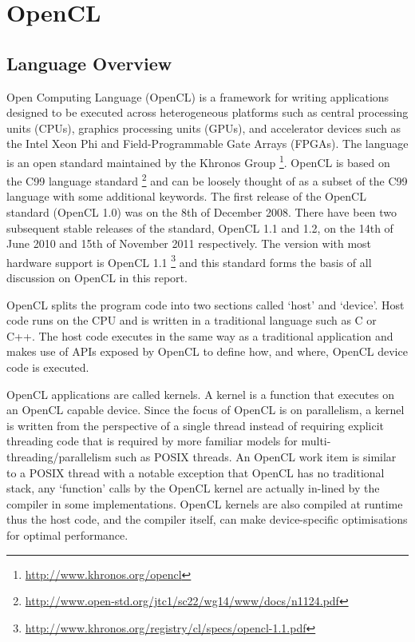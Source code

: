 \section{OpenCL}

\subsection{Language Overview}

Open Computing Language (OpenCL) is a framework for writing applications
designed to be executed across heterogeneous platforms such as central
processing units (CPUs), graphics processing units (GPUs), and accelerator
devices such as the Intel Xeon Phi and Field-Programmable Gate Arrays (FPGAs).
The language is an open standard maintained by the Khronos Group
\footnote{\url{http://www.khronos.org/opencl}}. OpenCL is based on the C99
language standard
\footnote{\url{http://www.open-std.org/jtc1/sc22/wg14/www/docs/n1124.pdf}} and
can be loosely thought of as a subset of the C99 language with some additional
keywords. The first release of the OpenCL standard (OpenCL 1.0) was on the 8th
of December 2008. There have been two subsequent stable releases of the
standard, OpenCL 1.1 and 1.2, on the 14th of June 2010 and 15th of November 2011
respectively. The version with most hardware support is OpenCL 1.1
\footnote{\url{http://www.khronos.org/registry/cl/specs/opencl-1.1.pdf}} and
this standard forms the basis of all discussion on OpenCL in this report.

OpenCL splits the program code into two sections called `host' and `device'.
Host code runs on the CPU and is written in a traditional language such as C or
C++. The host code executes in the same way as a traditional application and
makes use of APIs exposed by OpenCL to define how, and where, OpenCL device code
is executed.

OpenCL applications are called kernels. A kernel is a function that executes on
an OpenCL capable device. Since the focus of OpenCL is on parallelism, a kernel
is written from the perspective of a single thread instead of requiring explicit
threading code that is required by more familiar models for
multi-threading/parallelism such as POSIX threads. An OpenCL work item is
similar to a POSIX thread with a notable exception that OpenCL has no
traditional stack, any `function' calls by the OpenCL kernel are actually
in-lined by the compiler in some implementations. OpenCL kernels are also
compiled at runtime thus the host code, and the compiler itself, can make
device-specific optimisations for optimal performance.

